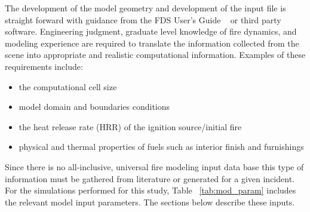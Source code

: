 \documentclass[11pt,oneside]{book}
\begin{document}
The development of the model geometry and development of the input file is straight forward with guidance from the FDS User's Guide ~\cite{FDS_Users_Guide} or third party software.  Engineering judgment, graduate level knowledge of fire dynamics, and modeling experience are required to  translate the information collected from the scene into appropriate and realistic computational information.  Examples of these requirements include:
\begin{itemize}
\item the computational cell size
\item model domain and boundaries conditions
\item the heat release rate (HRR) of the ignition source/initial fire
\item physical and thermal properties of fuels such as interior finish and furnishings
\end{itemize}
Since there is no all-inclusive, universal fire modeling input data base this type of information must be gathered from literature or generated for a given incident. For the simulations performed for this study, Table ~\ref{tab:mod_param} includes the relevant model input parameters. The sections below describe these inputs. 
\end{document}
